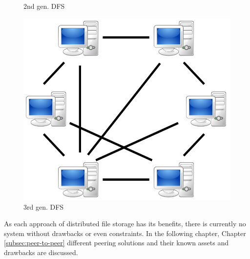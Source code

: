 \begin{figure}
\begin{minipage}{.33\textwidth}
		\caption[myfakelabel]{2nd gen. DFS}
		\label{2nd_gen_dfs}
	\end{minipage}
	\begin{minipage}{.33\textwidth}
		\centering
		\includegraphics[scale=0.175]{Talk5/3rd_gen_dfs.PNG}
		\caption[myfakelabel]{3rd gen. DFS\footnotemark[1]{}}
		\label{3rd_gen_dfs}
	\end{minipage}
\end{figure}

As each approach of distributed file storage has its benefits, there is currently no system without drawbacks or even constraints. In the following chapter, Chapter \ref{subsec:peer-to-peer} different peering solutions and their known assets and drawbacks are discussed.

